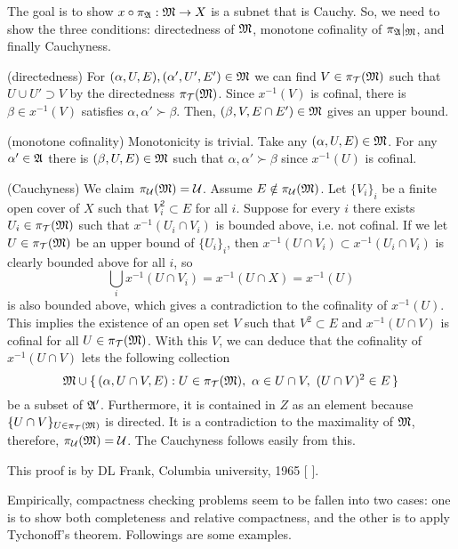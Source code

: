 \documentclass{../exp}
\begin{document}
\begin{pf}[1]

The goal is to show $x\o\pi_\fA:\fM\to X$ is a subnet that is Cauchy.
So, we need to show the three conditions: directedness of $\mathfrak{M}$, monotone cofinality of $\pi_{\mathfrak{A}}|_{\mathfrak{M}}$, and finally Cauchyness.

(directedness)
For $(\alpha,U,E),(\alpha',U',E')\in\mathfrak{M}$ we can find $V\in\pi_{\mathcal{T}}(\mathfrak{M})$ such that $U\cup U'\supset V$ by the directedness $\pi_{\mathcal{T}}(\mathfrak{M})$.
Since $x^{-1}(V)$ is cofinal, there is $\beta\in x^{-1}(V)$ satisfies $\alpha,\alpha'\succ\beta$.
Then, $(\beta,V,E\cap E')\in\mathfrak{M}$ gives an upper bound.

(monotone cofinality)
Monotonicity is trivial.
Take any $(\alpha,U,E)\in\mathfrak{M}$.
For any $\alpha'\in\mathfrak{A}$ there is $(\beta,U,E)\in\mathfrak{M}$ such that $\alpha,\alpha'\succ\beta$ since $x^{-1}(U)$ is cofinal.

(Cauchyness)
We claim $\pi_{\mathcal{U}}(\mathfrak{M})=\mathcal{U}$.
Assume $E\notin\pi_{\mathcal{U}}(\mathfrak{M})$.
Let $\{V_i\}_i$ be a finite open cover of $X$ such that $V_i^2\subset E$ for all $i$.
Suppose for every $i$ there exists $U_i\in\pi_{\mathcal{T}}(\mathfrak{M})$ such that $x^{-1}(U_i\cap V_i)$ is bounded above, i.e. not cofinal.
If we let $U\in\pi_{\mathcal{T}}(\mathfrak{M})$ be an upper bound of $\{U_i\}_i$, then $x^{-1}(U\cap V_i)\subset x^{-1}(U_i\cap V_i)$ is clearly bounded above for all $i$, so
\[\bigcup_ix^{-1}(U\cap V_i)=x^{-1}(U\cap X)=x^{-1}(U)\]
is also bounded above, which gives a contradiction to the cofinality of $x^{-1}(U)$.
This implies the existence of an open set $V$ such that $V^2\subset E$ and $x^{-1}(U\cap V)$ is cofinal for all $U\in\pi_{\mathcal{T}}(\mathfrak{M})$.
With this $V$, we can deduce that the cofinality of $x^{-1}(U\cap V)$ lets the following collection
\[\fM\cup\{\,(\alpha,U\cap V,E):U\in\pi_\cT(\fM),\ \alpha\in U\cap V,\ (U\cap V)^2\in E\,\}\]
be a subset of $\mathfrak{A}'$.
Furthermore, it is contained in $Z$ as an element because $\{U\cap V\}_{U\in\pi_{\mathcal{T}}(\mathfrak{M})}$ is directed.
It is a contradiction to the maximality of $\mathfrak{M}$, therefore, $\pi_{\mathcal{U}}(\mathfrak{M})=\mathcal{U}$.
The Cauchyness follows easily from this.
\end{pf}
\begin{pf}[2]
This proof is by DL Frank, Columbia university, 1965 [ ].

\end{pf}


Empirically, compactness checking problems seem to be fallen into two cases: one is to show both completeness and relative compactness, and the other is to apply Tychonoff's theorem.
Followings are some examples.
\end{document}
